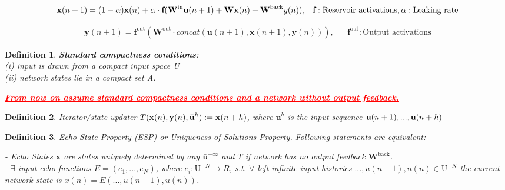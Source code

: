 \documentclass{article}
\newtheorem{definition}{Definition}
\begin{document}
\begin{align}
    \textbf{x}(n+1) =  (1 - \alpha)\textbf x(n) + \alpha \cdot \textbf{f}(\textbf{W}^{\text{in}}\textbf u(n+1) + \textbf{W}\textbf{x}(n) + \textbf{W}^\text{back} y(n)), && \textbf{f}: \text{Reservoir activations}, \alpha: \text{Leaking rate}
\end{align}

\begin{align}
    \textbf{y}(n+1) = \textbf{f}^{\text{out}}(\textbf{W}^{\text{out}} \cdot concat(\textbf{u}(n+1),\textbf{x}(n+1) ,\textbf{y}(n))), && \textbf{f}^{\text{out}}: \text{Output activations}
\end{align}

\begin{definition}
\textbf{Standard compactness conditions}: \\
(i) input is drawn from a compact input space U \\
(ii) network states lie in a compact set A.
\end{definition}

\textit{\textbf{\textcolor{red}{\underline{From now on assume standard compactness conditions and a network without output feedback.}}}}

\begin{definition}
Iterator/state updater $T(\textbf x(n), \textbf y(n),\bar{\textbf u}^h) := \textbf x(n + h)
$, where $\bar{\textbf{u}}^h$ is the input sequence $\textbf u(n + 1), . . . , \textbf u(n + h)$
\end{definition}

\begin{definition}
Echo State Property (ESP) or Uniqueness of Solutions Property. Following statements are equivalent:

- Echo States $\textbf{x}$ are states uniquely determined by any $\bar{\textbf{u}}^{-\infty}$ and $T$ if network has no output feedback $\textbf{W}^{\text{back}}$.\\

- $\exists$ input echo functions $E = (e_1,...,e_N)$, where $e_i :\text{U}^{-N} \rightarrow R$, s.t. $\forall$ left-infinite input histories $..., u(n - 1), u(n) \in \text{U}^{- N}$ the current network state is $x(n) = E(..., u(n - 1), u(n))$.
\end{definition}
\end{document}
